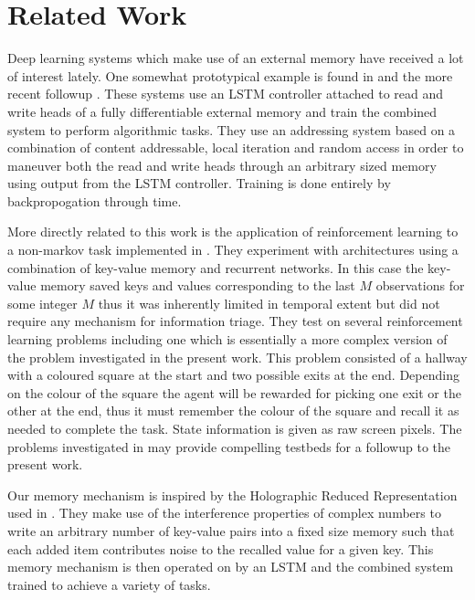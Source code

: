 \documentclass{article}
\begin{document}
\section*{Related Work}
Deep learning systems which make use of an external memory have received a lot of interest lately. One somewhat prototypical example is found in \cite{NTM} and the more recent followup \cite{DNC} . These systems use an LSTM controller attached to read and write heads of a fully differentiable external memory and train the combined system to perform algorithmic tasks. They use an addressing system based on a combination of content addressable, local iteration and random access in order to maneuver both the read and write heads through an arbitrary sized memory using output from the LSTM controller. Training is done entirely by backpropogation through time.

More directly related to this work is the application of reinforcement learning to a non-markov task implemented in \cite{MC}. They experiment with architectures using a combination of key-value memory and recurrent networks. In this case the key-value memory saved keys and values corresponding to the last $M$ observations for some integer $M$ thus it was inherently limited in temporal extent but did not require any mechanism for information triage. They test on several reinforcement learning problems including one which is essentially a more complex version of the problem investigated in the present work. This problem consisted of a hallway with a coloured square at the start and two possible exits at the end. Depending on the colour of the square the agent will be rewarded for picking one exit or the other at the end, thus it must remember the colour of the square and recall it as needed to complete the task. State information is given as raw screen pixels. The problems investigated in \cite{MC} may provide compelling testbeds for a followup to the present work.

Our memory mechanism is inspired by the Holographic Reduced Representation used in \cite{LSTM}. They make use of the interference properties of complex numbers to write an arbitrary number of key-value pairs into a fixed size memory such that each added item contributes noise to the recalled value for a given key. This memory mechanism is then operated on by an LSTM and the combined system trained to achieve a variety of tasks.
\end{document}
